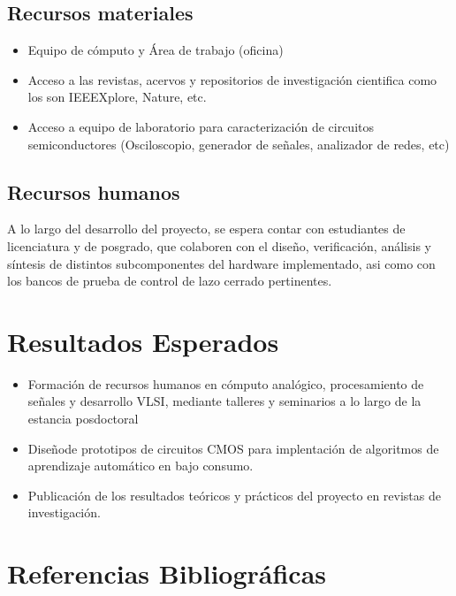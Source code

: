 \documentclass[letter, 12pt]{article}
\begin{document}
\subsection{Recursos materiales}
\begin{itemize}
    \item Equipo de cómputo y Área de trabajo (oficina)
    \item Acceso a las revistas, acervos y repositorios de investigación cientifica como los son IEEEXplore, Nature, etc. 
    \item Acceso a equipo de laboratorio para caracterización de circuitos semiconductores (Osciloscopio, generador de señales, analizador de redes, etc)
\end{itemize}

\subsection{Recursos humanos}
A lo largo del desarrollo del proyecto, se espera contar con estudiantes de licenciatura y de posgrado, que colaboren con el diseño, verificación, análisis y síntesis de distintos subcomponentes del hardware implementado, asi como con los bancos de prueba de control de lazo cerrado pertinentes.



\section{Resultados Esperados}
\begin{itemize}
    \item  Formación de recursos humanos en cómputo analógico, procesamiento de señales y desarrollo VLSI, mediante talleres y seminarios a lo largo de la estancia posdoctoral
    \item Diseñode prototipos de circuitos CMOS para implentación de algoritmos de aprendizaje automático en bajo consumo. 
    \item Publicación de los resultados teóricos y prácticos del proyecto en revistas de investigación.
    \end{itemize}
    
\section{Referencias Bibliográficas}
\end{document}
